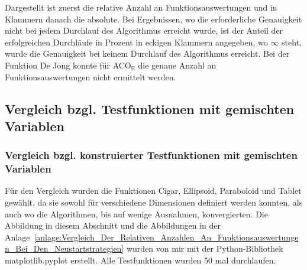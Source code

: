 \documentclass[fontsize=12, a4aper]{scrartcl}
\begin{document}
\begin{table}[H]
\begin{tabularx}{\linewidth}{ l X X X X X X}
			\bottomrule
			
		\end{tabularx}
		
		\smallskip
		
		Dargestellt ist zuerst die relative Anzahl an Funktionsauswertungen und in Klammern danach die absolute. Bei Ergebnissen, wo die erforderliche Genauigkeit nicht bei jedem Durchlauf des Algorithmus erreicht wurde, ist der Anteil der erfolgreichen Durchläufe in Prozent in eckigen Klammern angegeben, wo \(\infty\) steht, wurde die Genauigkeit bei keinem Durchlauf des Algorithmus erreicht. Bei der Funktion \glqq De Jong\grqq{} konnte für ACO\(_{\mathbb{R}}\) die genaue Anzahl an Funktionsauswertungen nicht ermittelt werden.\hfill\newline
		
	\end{table}
	
	\subsection{Vergleich bzgl. Testfunktionen mit gemischten Variablen} \label{subsec:Vergleich_Testfunktionen_Gemischte_Variablen}
	
	\subsubsection{Vergleich bzgl. konstruierter Testfunktionen mit gemischten Variablen} \label{subsubsec:Vergleich_Algorithmen:Vergleich_Auf_Konstruierten_Testfunktionen_Mit_Gemischten_Variablen}
	
	Für den Vergleich wurden die Funktionen \glqq Cigar\grqq, \glqq Ellipsoid\grqq, \glqq Paraboloid\grqq{} und \glqq Tablet\grqq{} gewählt, da sie sowohl für verschiedene Dimensionen definiert werden konnten, als auch wo die Algorithmen, bis auf wenige Ausnahmen, konvergierten. Die Abbildung in diesem Abschnitt und die Abbildungen in der Anlage~\ref{anlage:Vergleich_Der_Relativen_Anzahlen_An_Funktionsauswertungen_Bei_Den_Neustartstrategien} wurden von mir mit der Python-Bibliothek \glqq matplotlib.pyplot\grqq{} erstellt. Alle Testfunktionen wurden 50 mal durchlaufen.\hfill\newline
	
\end{document}

